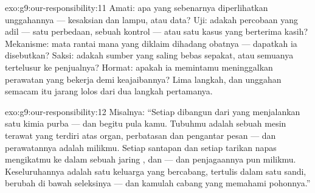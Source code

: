 \begin{solution}{exo:g9:our-responsibility:11}
Amati: apa yang sebenarnya diperlihatkan unggahannya ---
kesaksian dan lampu, atau data? Uji: adakah percobaan yang
adil --- satu perbedaan, sebuah kontrol --- atau satu kasus
yang berterima kasih? Mekanisme: mata rantai mana yang
diklaim dihadang obatnya --- dapatkah ia disebutkan? Saksi:
adakah sumber yang saling bebas sepakat, atau semuanya
tertelusur ke penjualnya? Hormat: apakah ia memintamu
meninggalkan perawatan yang bekerja demi keajaibannya? Lima
langkah, dan unggahan semacam itu jarang lolos dari dua
langkah pertamanya.
\end{solution}

\begin{solution}{exo:g9:our-responsibility:12}
Misalnya: ``Setiap  dibangun dari  yang
menjalankan satu kimia purba --- dan begitu pula kamu.
Tubuhmu adalah sebuah mesin terawat yang terdiri atas organ,
perbatasan dan pengantar pesan --- dan perawatannya adalah
milikmu. Setiap santapan dan setiap tarikan napas
mengikatmu ke dalam sebuah jaring ,  dan
 --- dan penjagaannya pun milikmu. Keseluruhannya
adalah satu keluarga yang bercabang, tertulis dalam satu
sandi, berubah di bawah seleksinya --- dan kamulah cabang
yang memahami pohonnya.''
\end{solution}

